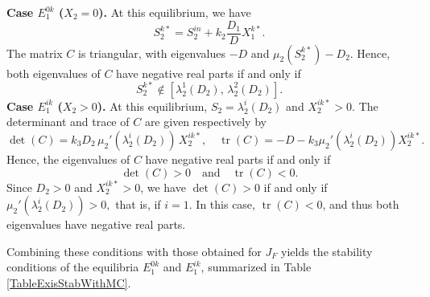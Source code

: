 \documentclass[runningheads]{llncs}
\begin{document}
\medskip
\noindent
\textbf{Case $E_1^{0k}$ ($X_2=0$).}
At this equilibrium, we have
\[
S_2^{k*} = S_2^{in} + k_2 \frac{D_1}{D} X_1^{k*}.
\]
The matrix $C$ is triangular, with eigenvalues $-D$ and 
$\mu_2(S_2^{k*}) - D_2$. Hence, both eigenvalues of $C$ have negative real parts if and only if
\[
S_2^{k*} \notin 
\left[\lambda_2^1(D_2),\,\lambda_2^2(D_2)\right].
\]
\medskip
\noindent
\textbf{Case $E_1^{ik}$ ($X_2>0$).}
At this equilibrium, $S_2=\lambda_2^i(D_2)$ and $X_2^{ik*}>0$. 
The determinant and trace of $C$ are given respectively by
\[
\det(C) = k_3 D_2\, \mu_2'(\lambda_2^i(D_2))\, X_2^{ik*}, 
\quad 
\operatorname{tr}(C) = -D - k_3 \mu_2'(\lambda_2^i(D_2)) X_2^{ik*}.
\]
Hence, the eigenvalues of $C$ have negative real parts if and only if
\[
\det(C)>0 \quad \text{and} \quad \operatorname{tr}(C)<0.
\]
Since $D_2>0$ and $X_2^{ik*}>0$, we have $\det(C)>0$ if and only if
$
\mu_2'(\lambda_2^i(D_2)) > 0,
$
that is, if $i=1$. In this case, $\operatorname{tr}(C)<0$, and thus both eigenvalues have negative real parts.

Combining these conditions with those obtained for $J_F$ yields the stability conditions of the equilibria $E_1^{0k}$ and $E_1^{ik}$, summarized in Table \ref{TableExisStabWithMC}.
\end{document}
